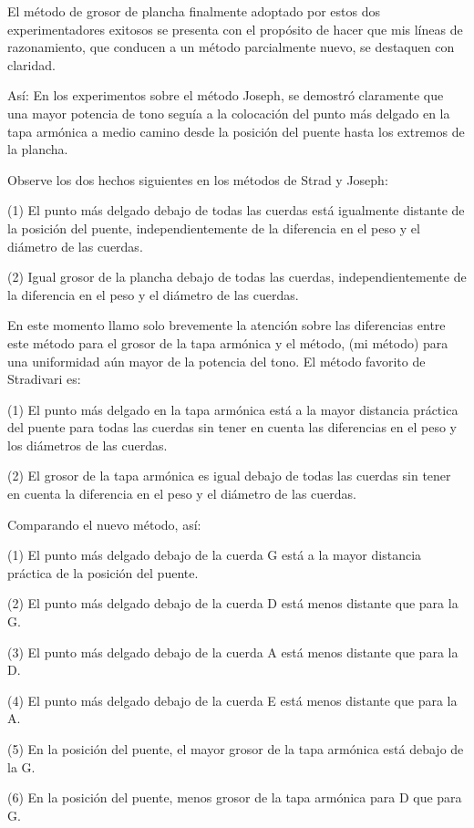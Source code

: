 \documentclass[12pt]{book}
\begin{document}
El método de grosor de plancha finalmente adoptado por estos dos experimentadores exitosos se presenta con el propósito de hacer que mis líneas de razonamiento, que conducen a un método parcialmente nuevo, se destaquen con claridad.

Así: En los experimentos sobre el método Joseph, se demostró claramente que una mayor potencia de tono seguía a la colocación del punto más delgado en la tapa armónica a medio camino desde la posición del puente hasta los extremos de la plancha.

Observe los dos hechos siguientes en los métodos de Strad y Joseph:

(1) El punto más delgado debajo de todas las cuerdas está igualmente distante de la posición del puente, independientemente de la diferencia en el peso y el diámetro de las cuerdas.

(2) Igual grosor de la plancha debajo de todas las cuerdas, independientemente de la diferencia en el peso y el diámetro de las cuerdas.

En este momento llamo solo brevemente la atención sobre las diferencias entre este método para el grosor de la tapa armónica y el método, (mi método) para una uniformidad aún mayor de la potencia del tono. El método favorito de Stradivari es:

(1) El punto más delgado en la tapa armónica está a la mayor distancia práctica del puente para todas las cuerdas sin tener en cuenta las diferencias en el peso y los diámetros de las cuerdas.

(2) El grosor de la tapa armónica es igual debajo de todas las cuerdas sin tener en cuenta la diferencia en el peso y el diámetro de las cuerdas.

Comparando el nuevo método, así:

(1) El punto más delgado debajo de la cuerda G está a la mayor distancia práctica de la posición del puente.

(2) El punto más delgado debajo de la cuerda D está menos distante que para la G.

(3) El punto más delgado debajo de la cuerda A está menos distante que para la D.

(4) El punto más delgado debajo de la cuerda E está menos distante que para la A.

(5) En la posición del puente, el mayor grosor de la tapa armónica está debajo de la G.

(6) En la posición del puente, menos grosor de la tapa armónica para D que para G.
\end{document}
